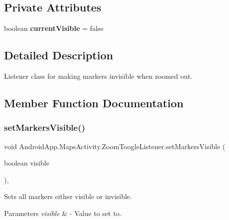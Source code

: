 \subsection*{Private Attributes}
\begin{DoxyCompactItemize}
\item 
\mbox{\label{class_android_app_1_1_maps_activity_1_1_zoom_toogle_listener_a1c1bb0e72be3b6a370322a2b90518ab2}} 
boolean {\bfseries current\+Visible} = false
\end{DoxyCompactItemize}


\subsection{Detailed Description}
Listener class for making markers invisible when zoomed out. 

\subsection{Member Function Documentation}
\mbox{\label{class_android_app_1_1_maps_activity_1_1_zoom_toogle_listener_a87b5d78c37a7c1494cb84d613420286f}} 
\subsubsection{\texorpdfstring{set\+Markers\+Visible()}{setMarkersVisible()}}
{\footnotesize\ttfamily void Android\+App.\+Maps\+Activity.\+Zoom\+Toogle\+Listener.\+set\+Markers\+Visible (\begin{DoxyParamCaption}\item[{boolean}]{visible }\end{DoxyParamCaption})\hspace{0.3cm}{\ttfamily [inline]}, {\ttfamily [private]}}



Sets all markers either visible or invisible. 


\begin{DoxyParams}{Parameters}
{\em visible} & -\/ Value to set to. \\
\hline
\end{DoxyParams}

